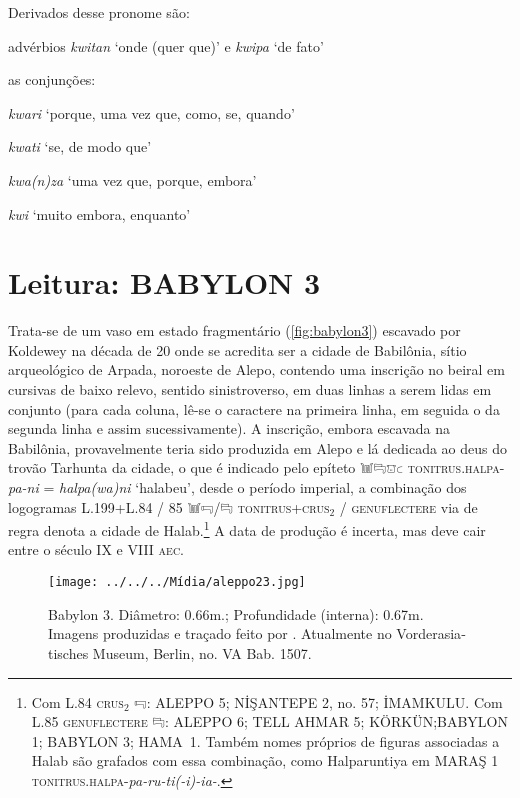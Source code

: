 \noindent Derivados desse pronome são:
\begin{compactitem}
	\item advérbios \emph{kwitan} `onde (quer que)' e \emph{kwipa} `de fato'
	\item as conjunções:
	\begin{compactitem}
		\item \emph{kwari} `porque, uma vez que, como, se, quando'
		\item \emph{kwati} `se, de modo que'
		\item \emph{kwa{(n)}za} `uma vez que, porque, embora'
		\item \emph{kwi} `muito embora, enquanto'
	\end{compactitem}
\end{compactitem}


\clearpage

\chapter{Leitura: BABYLON 3}

Trata-se de um vaso em estado fragmentário (\autoref{fig:babylon3}) escavado por
Koldewey na década de 20 onde se acredita ser a cidade de Babilônia, sítio
arqueológico de Arpada, noroeste de Alepo, contendo uma inscrição no
beiral em cursivas de baixo relevo, sentido sinistroverso, em duas linhas a
serem lidas em conjunto (para cada coluna, lê-se o caractere na primeira linha,
em seguida o da segunda linha e assim sucessivamente).
A inscrição, embora escavada na Babilônia, provavelmente teria sido
produzida em Alepo e lá dedicada ao deus do trovão Tarhunta da cidade, o que é
indicado pelo epíteto 𔓢𔑞𔕸𔗐 \textsc{tonitrus.halpa}-\textit{pa-ni}
= \textit{halpa{(wa)}ni} `halabeu', desde o período imperial,
a combinação dos logogramas L.199+L.84 \slash{} 85 𔓢𔑝\slash{}𔑞
\textsc{tonitrus+crus$_2$ \slash{} genuflectere}
via de regra denota a cidade de Halab.\footnote{Com L.84
\textsc{crus}$_2$ 𔑝: ALEPPO 5; NİŞANTEPE 2, no. 57; İMAMKULU.\@
Com L.85 \textsc{genuflectere} 𔑞:  ALEPPO 6; TELL AHMAR 5;
KÖRKÜN;\@ BABYLON 1; BABYLON 3; \mbox{HAMA 1}.\@
Também nomes próprios de figuras associadas a Halab são grafados com essa
combinação, como Halparuntiya em
MARAŞ 1 \textsc{tonitrus.halpa}-\textit{pa-ru-ti{(-i)}-ia-}.
}
A data de produção é incerta, mas deve cair entre o século IX e VIII
\textsc{aec}.

\vfill

\begin{figure}[!htb]
	\texttt{[image: ../../../Mídia/aleppo23.jpg]}
	\caption{
		Babylon 3. Diâmetro: 0.66m.; Profundidade
		(interna): 0.67m. Imagens produzidas e traçado feito por
		\citet[\emph{plate} 212]{CHLI13}. Atualmente no
		\foreignlanguage{german}{Vorderasiatisches Museum}, Berlin,
		no. VA Bab. 1507.
	}\label{fig:babylon3}
\end{figure}

